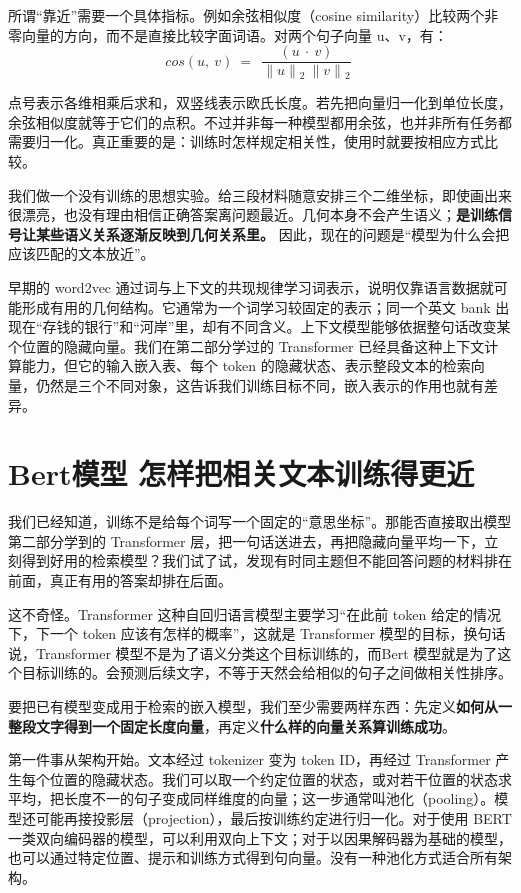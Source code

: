 所谓``靠近''需要一个具体指标。例如余弦相似度（cosine similarity）比较两个非零向量的方向，而不是直接比较字面词语。对两个句子向量 u、v，有：
\[cos(u,\ v)\  = \ \ \frac{(u\  \cdot \ v)}{\| u\| \ensuremath{{}_{2}}\ \| v\| \ensuremath{{}_{2}}}\ \]

点号表示各维相乘后求和，双竖线表示欧氏长度。若先把向量归一化到单位长度，余弦相似度就等于它们的点积。不过并非每一种模型都用余弦，也并非所有任务都需要归一化。真正重要的是：训练时怎样规定相关性，使用时就要按相应方式比较。

我们做一个没有训练的思想实验。给三段材料随意安排三个二维坐标，即使画出来很漂亮，也没有理由相信正确答案离问题最近。几何本身不会产生语义；\textbf{是训练信号让某些语义关系逐渐反映到几何关系里。} 因此，现在的问题是``模型为什么会把应该匹配的文本放近''。

早期的 word2vec 通过词与上下文的共现规律学习词表示，说明仅靠语言数据就可能形成有用的几何结构。它通常为一个词学习较固定的表示；同一个英文 bank 出现在``存钱的银行''和``河岸''里，却有不同含义。上下文模型能够依据整句话改变某个位置的隐藏向量。我们在第二部分学过的 Transformer 已经具备这种上下文计算能力，但它的输入嵌入表、每个 token 的隐藏状态、表示整段文本的检索向量，仍然是三个不同对象，这告诉我们训练目标不同，嵌入表示的作用也就有差异。

\section{Bert模型 怎样把相关文本训练得更近}\label{Bert模型 怎样把相关文本训练得更近}

我们已经知道，训练不是给每个词写一个固定的``意思坐标''。那能否直接取出模型第二部分学到的 Transformer 层，把一句话送进去，再把隐藏向量平均一下，立刻得到好用的检索模型？我们试了试，发现有时同主题但不能回答问题的材料排在前面，真正有用的答案却排在后面。

这不奇怪。Transformer 这种自回归语言模型主要学习``在此前 token 给定的情况下，下一个 token 应该有怎样的概率''，这就是 Transformer 模型的目标，换句话说，Transformer 模型不是为了语义分类这个目标训练的，而Bert 模型就是为了这个目标训练的。会预测后续文字，不等于天然会给相似的句子之间做相关性排序。

要把已有模型变成用于检索的嵌入模型，我们至少需要两样东西：先定义\textbf{如何从一整段文字得到一个固定长度向量}，再定义\textbf{什么样的向量关系算训练成功}。

第一件事从架构开始。文本经过 tokenizer 变为 token ID，再经过 Transformer 产生每个位置的隐藏状态。我们可以取一个约定位置的状态，或对若干位置的状态求平均，把长度不一的句子变成同样维度的向量；这一步通常叫池化（pooling）。模型还可能再接投影层（projection），最后按训练约定进行归一化。对于使用 BERT 一类双向编码器的模型，可以利用双向上下文；对于以因果解码器为基础的模型，也可以通过特定位置、提示和训练方式得到句向量。没有一种池化方式适合所有架构。

